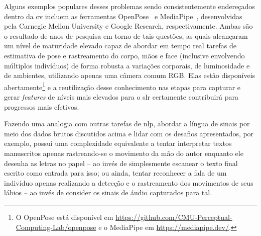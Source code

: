 Alguns exemplos populares desses problemas sendo consistentemente endereçados dentro da \acrshort{cv} incluem as ferramentas OpenPose~\cite{wei-2016-conv-machines-openpose,cao-2017-openpose,simon-2017-openpose-hand-face} e MediaPipe~\cite{lugaresi-2019-mediapipe,bazarevsky-2019-mediapipe-blazeface,vakunov-2020-mediapipe-hands,bazarevsky-2020-mediapipe-blazepose}, desenvolvidas pela Carnegie Mellon University e Google Research, respectivamente.
Ambas são o resultado de anos de pesquisa em torno de tais questões, as quais alcançaram um nível de maturidade elevado capaz de abordar em tempo real tarefas de estimativa de pose e rastreamento do corpo, mãos e face (inclusive envolvendo múltiplos indivíduos) de forma robusta a variações corporais, de luminosidade e de ambientes, utilizando apenas uma câmera comum RGB.
Elas estão disponíveis abertamente\footnote{
    O OpenPose está disponível em \url{https://github.com/CMU-Perceptual-Computing-Lab/openpose} e o MediaPipe em \url{https://mediapipe.dev/}.
} e a reutilização desse conhecimento nas etapas para capturar e gerar \textit{features} de níveis mais elevados para o \acrshort{slr} certamente contribuirá para progressos mais efetivos.


Fazendo uma analogia com outras tarefas de \acrshort{nlp}, abordar a língua de sinais por meio dos dados brutos discutidos acima e lidar com os desafios apresentados, por exemplo, possui uma complexidade equivalente a tentar interpretar textos manuscritos apenas rastreando-se o movimento da mão do autor enquanto ele desenha as letras no papel -- ao invés de simplesmente escanear o texto final escrito como entrada para isso; ou ainda, tentar reconhecer a fala de um indivíduo apenas realizando a detecção e o rastreamento dos movimentos de seus lábios -- ao invés de consider os sinais de áudio capturados para tal.



